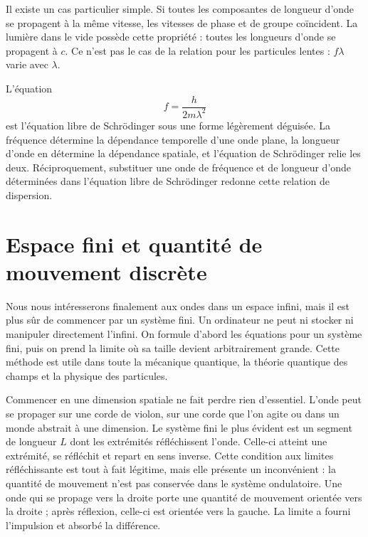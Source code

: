 Il existe un cas particulier simple. Si toutes les composantes de longueur d’onde se propagent à la même vitesse, les vitesses de phase et de groupe coïncident. La lumière dans le vide possède cette propriété : toutes les longueurs d’onde se propagent à \(c\). Ce n’est pas le cas de la relation pour les particules lentes : \(f\lambda\) varie avec \(\lambda\).

L’équation
\begin{equation}
f=\frac{h}{2m\lambda^2}
\end{equation}
est l’équation libre de Schr\"odinger sous une forme légèrement déguisée. La fréquence détermine la dépendance temporelle d’une onde plane, la longueur d’onde en détermine la dépendance spatiale, et l’équation de Schr\"odinger relie les deux. Réciproquement, substituer une onde de fréquence et de longueur d’onde déterminées dans l’équation libre de Schr\"odinger redonne cette relation de dispersion.

\begin{classroomqa}
\end{classroomqa}

\section{Espace fini et quantité de mouvement discrète}

Nous nous intéresserons finalement aux ondes dans un espace infini, mais il est plus sûr de commencer par un système fini. Un ordinateur ne peut ni stocker ni manipuler directement l’infini. On formule d’abord les équations pour un système fini, puis on prend la limite où sa taille devient arbitrairement grande. Cette méthode est utile dans toute la mécanique quantique, la théorie quantique des champs et la physique des particules.

Commencer en une dimension spatiale ne fait perdre rien d’essentiel. L’onde peut se propager sur une corde de violon, sur une corde que l’on agite ou dans un monde abstrait à une dimension. Le système fini le plus évident est un segment de longueur \(L\) dont les extrémités réfléchissent l’onde. Celle-ci atteint une extrémité, se réfléchit et repart en sens inverse. Cette condition aux limites réfléchissante est tout à fait légitime, mais elle présente un inconvénient : la quantité de mouvement n’est pas conservée dans le système ondulatoire. Une onde qui se propage vers la droite porte une quantité de mouvement orientée vers la droite ; après réflexion, celle-ci est orientée vers la gauche. La limite a fourni l’impulsion et absorbé la différence.


